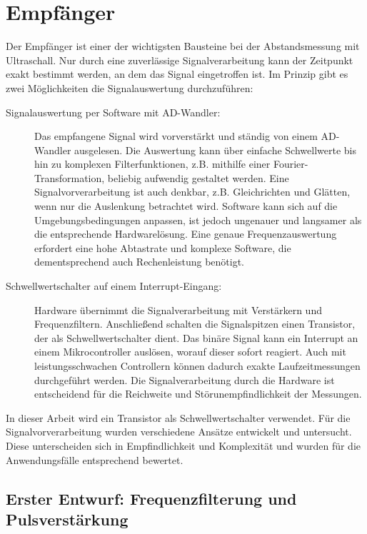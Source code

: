 \section{Empfänger}
Der Empfänger ist einer der wichtigsten Bausteine bei der Abstandsmessung mit Ultraschall. Nur durch eine zuverlässige Signalverarbeitung kann der Zeitpunkt exakt bestimmt werden, an dem das Signal eingetroffen ist. Im Prinzip gibt es zwei Möglichkeiten die Signalauswertung durchzuführen:
\begin{description} %
	\item[Signalauswertung per Software mit AD-Wandler:] Das empfangene Signal wird vorverstärkt und ständig von einem AD-Wandler ausgelesen. Die Auswertung kann über einfache Schwellwerte bis hin zu komplexen Filterfunktionen, z.B. mithilfe einer Fourier-Transformation, beliebig aufwendig gestaltet werden. Eine Signalvorverarbeitung ist auch denkbar, z.B. Gleichrichten und Glätten, wenn nur die Auslenkung betrachtet wird. Software kann sich auf die Umgebungsbedingungen anpassen, ist jedoch ungenauer und langsamer als die entsprechende Hardwarelösung. Eine genaue Frequenzauswertung erfordert eine hohe Abtastrate und komplexe Software, die dementsprechend auch Rechenleistung benötigt.
	\item[Schwellwertschalter auf einem Interrupt-Eingang:] Hardware übernimmt die Signalverarbeitung mit Verstärkern und Frequenzfiltern. Anschließend schalten die Signalspitzen einen Transistor, der als Schwellwertschalter dient. Das binäre Signal kann ein Interrupt an einem Mikrocontroller auslösen, worauf dieser sofort reagiert. Auch mit leistungsschwachen Controllern können dadurch exakte Laufzeitmessungen durchgeführt werden. Die Signalverarbeitung durch die Hardware ist entscheidend für die Reichweite und Störunempfindlichkeit der Messungen.
\end{description}
In dieser Arbeit wird ein Transistor als Schwellwertschalter verwendet. Für die Signalvorverarbeitung wurden verschiedene Ansätze entwickelt und untersucht. Diese unterscheiden sich in Empfindlichkeit und Komplexität und wurden für die Anwendungsfälle entsprechend bewertet.



\subsection{Erster Entwurf: Frequenzfilterung und Pulsverstärkung}

